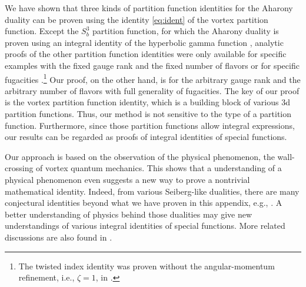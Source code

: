 \documentclass[a4paper,11pt]{article}
\begin{document}
We have shown that three kinds of partition function identities for the Aharony duality can be proven using the identity \eqref{eq:ident} of the vortex partition function. Except the $S^3_b$ partition function, for which the Aharony duality is proven using an integral identity of the hyperbolic gamma function \cite{Bult:2007,Willett:2011gp,Benini:2011mf,Amariti:2014lla}, analytic proofs of the other partition function identities were only available for specific examples with the fixed gauge rank and the fixed number of flavors \cite{Krattenthaler:2011da,Hwang:2012jh} or for specific fugacities \cite{Closset:2016arn}.\footnote{The twisted index identity was proven without the angular-momentum refinement, i.e., $\zeta = 1$, in \cite{Closset:2016arn}.} Our proof, on the other hand, is for the arbitrary gauge rank and the arbitrary number of flavors with full generality of fugacities. The key of our proof is the vortex partition function identity, which is a building block of various 3d partition functions. Thus, our method is not sensitive to the type of a partition function. Furthermore, since those partition functions allow integral expressions, our results can be regarded as proofs of integral identities of special functions.

Our approach is based on the observation of the physical phenomenon, the wall-crossing of vortex quantum mechanics. This shows that a understanding of a physical phenomenon even suggests a new way to prove a nontrivial mathematical identity. Indeed, from various Seiberg-like dualities, there are many conjectural identities beyond what we have proven in this appendix, e.g., \cite{Bashkirov:2011vy,Hwang:2011qt,Hwang:2011ht,Kapustin:2011vz,Cheon:2012be,Kim:2013cma,Aharony:2013dha,Park:2013wta,Aharony:2013kma,Gahramanov:gka,Amariti:2014iza,Gahramanov:2014ona,Amariti:2015vwa}. A better understanding of physics behind those dualities may give new understandings of various integral identities of special functions. More related discussions are also found in \cite{Gahramanov:2013rda,Gahramanov:2016wxi}.
\\








\end{document}
